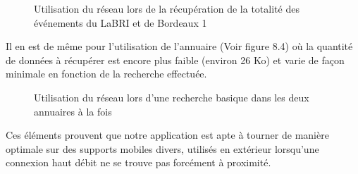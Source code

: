 \begin{figure}[h!]
  \label{fig:network_statistics_events}
  \center
  \setlength\fboxsep{5pt}
  \setlength\fboxrule{0.5pt}
  \caption{Utilisation du réseau lors de la récupération de la totalité des événements du LaBRI et de Bordeaux 1}
\end{figure}

Il en est de même pour l’utilisation de l’annuaire (Voir figure 8.4) où la quantité de données à récupérer est encore plus faible (environ 26 Ko) et varie de façon minimale en fonction de la recherche effectuée. 

\begin{figure}[h!]
  \label{fig:network_statistics_directory}
  \center
  \setlength\fboxsep{5pt}
  \setlength\fboxrule{0.5pt}
  \caption{Utilisation du réseau lors d'une recherche basique dans les deux annuaires à la fois}
\end{figure}

Ces éléments prouvent que notre application est apte à tourner de manière optimale sur des supports mobiles divers, utilisés en extérieur lorsqu’une connexion haut débit ne se trouve pas forcément à proximité.